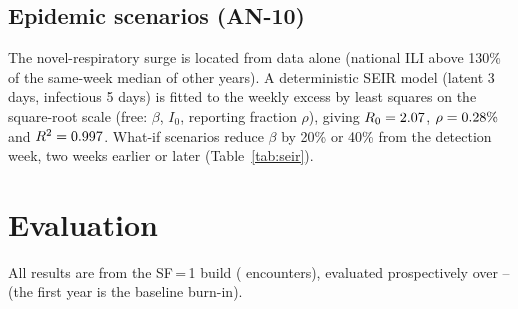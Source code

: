 \documentclass[conference]{IEEEtran}
\begin{document}
\subsection{Epidemic scenarios (AN-10)}
The novel-respiratory surge is located from data alone (national ILI above 130\% of the same-week median of
other years). A deterministic SEIR model (latent 3 days, infectious 5 days) is fitted to the weekly excess by
least squares on the square-root scale (free: $\beta$, $I_0$, reporting fraction $\rho$), giving
$R_0=2.07{}$, $\rho=0.28\%{}$ and $R^2=0.997{}$. What-if scenarios reduce $\beta$ by 20\% or 40\%
from the detection week, two weeks earlier or later (Table~\ref{tab:seir}).

\section{Evaluation}\label{sec:eval}
All results are from the SF\,=\,1 build (\GenRows{} encounters), evaluated prospectively over
\EvalStart{}--\EvalEnd{} (the first year is the baseline burn-in).
\end{document}
